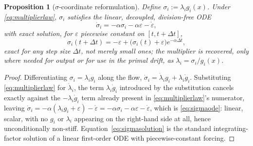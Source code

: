 \documentclass[10pt,a4paper]{amsart}
\newtheorem{proposition}{Proposition}
\begin{document}
\begin{proposition}[$\sigma$-coordinate reformulation] \label{prop:sigma}
Define $\sigma_i := \lambda_i g_i(x)$. Under \eqref{eq:multiplierlaw}, $\sigma_i$ satisfies the
linear, decoupled, division-free ODE
\begin{equation}
\dot\sigma_i = -\alpha\sigma_i - \alpha\varepsilon - \dot\varepsilon, \label{eq:sigmaode}
\end{equation}
with exact solution, for $\varepsilon$ piecewise constant on $[t, t+\Delta t]$,
\begin{equation}
\sigma_i(t + \Delta t) = -\varepsilon + \big(\sigma_i(t) + \varepsilon\big) e^{-\alpha \Delta t},
\label{eq:sigmasolution}
\end{equation}
exact for any step size $\Delta t$, not merely small ones; the multiplier is recovered, only
where needed for output or for use in the primal drift, as $\lambda_i = \sigma_i / g_i(x)$.
\end{proposition}

\begin{proof}
Differentiating $\sigma_i = \lambda_i g_i$ along the flow,
$\dot\sigma_i = \dot\lambda_i g_i + \lambda_i \dot g_i$. Substituting
\eqref{eq:multiplierlaw} for $\dot\lambda_i$, the term $\lambda_i \dot g_i$ introduced by the
substitution cancels exactly against the $-\lambda_i \dot g_i$ term already present in
\eqref{eq:multiplierlaw}'s numerator, leaving
$\dot\sigma_i = -\alpha(\lambda_i g_i + \varepsilon) - \dot\varepsilon
= -\alpha\sigma_i - \alpha\varepsilon - \dot\varepsilon$, which is \eqref{eq:sigmaode}: linear,
scalar, with no $g_i$ or $\lambda_i$ appearing on the right-hand side at all, hence
unconditionally non-stiff. Equation~\eqref{eq:sigmasolution} is the standard integrating-factor
solution of a linear first-order ODE with piecewise-constant forcing.
\end{proof}
\end{document}
